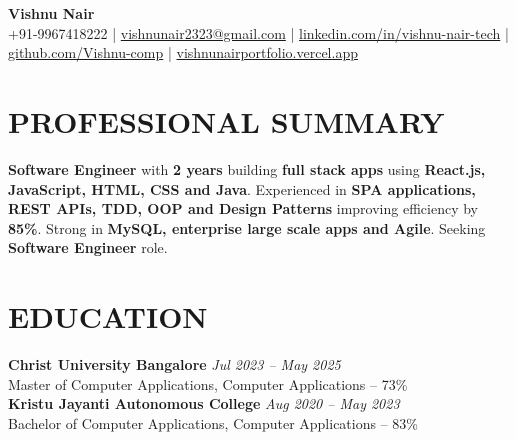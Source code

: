 \documentclass[10pt,a4paper]{article}
\begin{document}

\begin{center}

{\Large \textbf{Vishnu Nair}}\\[4pt]

{\small
+91-9967418222
\quad|\quad
\href{mailto:vishnunair2323@gmail.com}{vishnunair2323@gmail.com}
\quad|\quad
\href{https://linkedin.com/in/vishnu-nair-tech}{linkedin.com/in/vishnu-nair-tech}
\quad|\quad
\href{https://github.com/Vishnu-comp}{github.com/Vishnu-comp}
\quad|\quad
\href{https://vishnunairportfolio.vercel.app}{vishnunairportfolio.vercel.app}
}

\end{center}


\section*{PROFESSIONAL SUMMARY}

\small

\textbf{Software Engineer} with \textbf{2 years} building \textbf{full stack apps} using \textbf{React.js, JavaScript, HTML, CSS and Java}. Experienced in \textbf{SPA applications, REST APIs, TDD, OOP and Design Patterns} improving efficiency by \textbf{85\%}. Strong in \textbf{MySQL, enterprise large scale apps and Agile}. Seeking \textbf{Software Engineer} role.


\section*{EDUCATION}
\small
\textbf{Christ University Bangalore} \hfill \textit{Jul 2023 -- May 2025}\\
Master of Computer Applications, Computer Applications -- 73\%\\
\small
\textbf{Kristu Jayanti Autonomous College} \hfill \textit{Aug 2020 -- May 2023}\\
Bachelor of Computer Applications, Computer Applications -- 83\%

\end{document}
